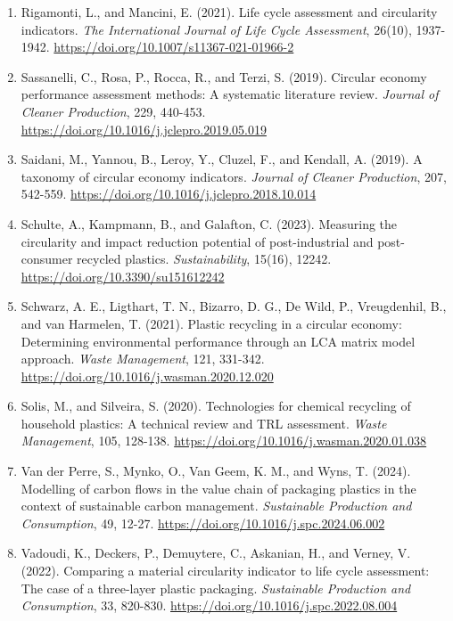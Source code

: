 \documentclass[review,10pt]{elsarticle}
\newcommand{\changepar}[1]{#1\par\medskip}
\begin{document}
\begin{enumerate}[leftmargin=*]
\item \changepar{Rigamonti, L., and Mancini, E. (2021). Life cycle assessment and circularity indicators. \textit{The International Journal of Life Cycle Assessment}, 26(10), 1937-1942. \url{https://doi.org/10.1007/s11367-021-01966-2}}

\item \changepar{Sassanelli, C., Rosa, P., Rocca, R., and Terzi, S. (2019). Circular economy performance assessment methods: A systematic literature review. \textit{Journal of Cleaner Production}, 229, 440-453. \url{https://doi.org/10.1016/j.jclepro.2019.05.019}}

\item \changepar{Saidani, M., Yannou, B., Leroy, Y., Cluzel, F., and Kendall, A. (2019). A taxonomy of circular economy indicators. \textit{Journal of Cleaner Production}, 207, 542-559. \url{https://doi.org/10.1016/j.jclepro.2018.10.014}}

\item \changepar{Schulte, A., Kampmann, B., and Galafton, C. (2023). Measuring the circularity and impact reduction potential of post-industrial and post-consumer recycled plastics. \textit{Sustainability}, 15(16), 12242. \url{https://doi.org/10.3390/su151612242}}

\item \changepar{Schwarz, A. E., Ligthart, T. N., Bizarro, D. G., De Wild, P., Vreugdenhil, B., and van Harmelen, T. (2021). Plastic recycling in a circular economy: Determining environmental performance through an LCA matrix model approach. \textit{Waste Management}, 121, 331-342. \url{https://doi.org/10.1016/j.wasman.2020.12.020}}

\item \changepar{Solis, M., and Silveira, S. (2020). Technologies for chemical recycling of household plastics: A technical review and TRL assessment. \textit{Waste Management}, 105, 128-138. \url{https://doi.org/10.1016/j.wasman.2020.01.038}}

\item \changepar{Van der Perre, S., Mynko, O., Van Geem, K. M., and Wyns, T. (2024). Modelling of carbon flows in the value chain of packaging plastics in the context of sustainable carbon management. \textit{Sustainable Production and Consumption}, 49, 12-27. \url{https://doi.org/10.1016/j.spc.2024.06.002}}

\item \changepar{Vadoudi, K., Deckers, P., Demuytere, C., Askanian, H., and Verney, V. (2022). Comparing a material circularity indicator to life cycle assessment: The case of a three-layer plastic packaging. \textit{Sustainable Production and Consumption}, 33, 820-830. \url{https://doi.org/10.1016/j.spc.2022.08.004}}

\end{enumerate}
\end{document}
